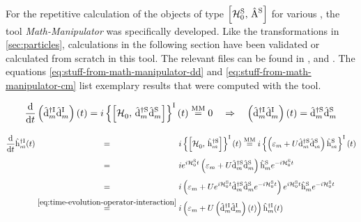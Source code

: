 For the repetitive calculation of the objects of type $\left[\HzeroHamiltonian[\schroedingerPicture],\, \Aop[\schroedingerPicture]\right]$ for various \Aop[\schroedingerPicture], the tool \emph{Math-Manipulator} was specifically developed. 
Like the transformations in \ref{sec:particles}, calculations in the following section have been validated or calculated from scratch in this tool.
The relevant files can be found in , and .
The equations \ref{eq:stuff-from-math-manipulator-dd} and \ref{eq:stuff-from-math-manipulator-cm} list exemplary results that were computed with the tool.

\begin{equation}
    \label{eq:stuff-from-math-manipulator-dd}
    \difft{}\left(\dop[\interactionPicture]{m}{\dagger}\dop[\interactionPicture]{m}{}\right)(t)
    = i \interactionTimeEvolution{\left[\HzeroHamiltonian[],\,\dop[\schroedingerPicture]{m}{\dagger}\dop[\schroedingerPicture]{m}{}\right]} \stackrel{\text{MM}}{=} 0 \quad \Rightarrow \quad \left(\dop[\interactionPicture]{m}{\dagger}\dop[\interactionPicture]{m}{}\right)(t) = \dop[\schroedingerPicture]{m}{\dagger}\dop[\schroedingerPicture]{m}{}
\end{equation}

\begin{equation}
    \label{eq:stuff-from-math-manipulator-cm}
    \begin{split}
        \difft{}\hopOfT[\interactionPicture]{m}{\dagger}
        &\stackrel{\phantom{\ref{eq:time-evolution-operator-interaction}}}{=} i \interactionTimeEvolution{\left[\HzeroHamiltonian[]{},\,\hop[\schroedingerPicture]{m}{\dagger}\right]} \stackrel{\text{MM}}{=} 
        i \interactionTimeEvolution{ \left(\epsl[m] + U \dop[\schroedingerPicture]{m}{\dagger}\dop[\schroedingerPicture]{m}{}\right)\hop[\schroedingerPicture]{m}{}}\\
        &\stackrel{\phantom{\ref{eq:time-evolution-operator-interaction}}}{=}i e^{i \HzeroHamiltonian[\schroedingerPicture]{} t} \left(\epsl[m] + U \dop[\schroedingerPicture]{m}{\dagger}\dop[\schroedingerPicture]{m}{}\right)\hop[\schroedingerPicture]{m}{}e^{-i \HzeroHamiltonian[\schroedingerPicture]{} t}\\
        &\stackrel{\phantom{\ref{eq:time-evolution-operator-interaction}}}{=}i \left(\epsl[m] + U e^{i \HzeroHamiltonian[\schroedingerPicture]{} t}\dop[\schroedingerPicture]{m}{\dagger}\dop[\schroedingerPicture]{m}{}e^{-i \HzeroHamiltonian[\schroedingerPicture]{} t}\right)e^{i \HzeroHamiltonian[\schroedingerPicture]{} t}\hop[\schroedingerPicture]{m}{}e^{-i \HzeroHamiltonian[\schroedingerPicture]{} t}\\
        &\stackrel{\ref{eq:time-evolution-operator-interaction}}{=}
        i \left(\epsl[m] + U \left(\dop[\interactionPicture]{m}{\dagger}\dop[\interactionPicture]{m}{}\right)(t)\right) \hopOfT[\interactionPicture]{m}{\dagger}\\
    \end{split}
\end{equation}

